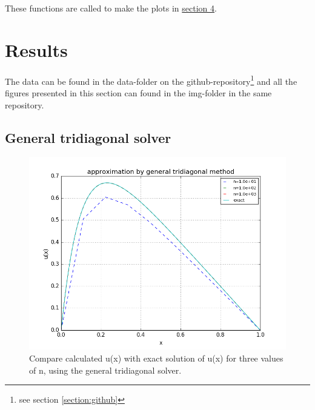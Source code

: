 \documentclass[11pt,a4paper,notitlepage]{article}
\begin{document}
These functions are called to make the plots in \hyperref[section:results]{section 4}.

\section{Results}
\label{section:results}
The data can be found in the data-folder on the github-repository\footnote{see section \ref{section:github}} and all the figures presented in this section can found in the img-folder in the same repository.

\subsection{General tridiagonal solver}
	\begin{figure}[H]
		\includegraphics[scale=0.7]{../img/compare_general_exact.png}
		\caption{Compare calculated u(x) with exact solution of u(x) for three values of n, using the general tridiagonal solver.}
		\label{fig:compare_gen_exact}
	\end{figure}
\end{document}

